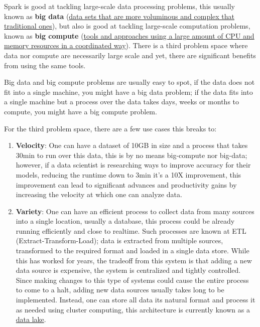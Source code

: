 \documentclass[]{book}
\theoremstyle{definition}
\theoremstyle{definition}
\theoremstyle{definition}
\theoremstyle{remark}
\begin{document}
Spark is good at tackling large-scale data processing problems, this
usually known as \textbf{big data}
(\href{https://en.wikipedia.org/wiki/big_data}{data sets that are more
voluminous and complex that traditional ones}), but also is good at
tackling large-scale computation problems, known as \textbf{big compute}
(\href{https://www.nimbix.net/glossary/big-compute/}{tools and
approaches using a large amount of CPU and memory resources in a
coordinated way}). There is a third problem space where data nor compute
are necessarily large scale and yet, there are significant benefits from
using the same tools.

Big data and big compute problems are usually easy to spot, if the data
does not fit into a single machine, you might have a big data problem;
if the data fits into a single machine but a process over the data takes
days, weeks or months to compute, you might have a big compute problem.

For the third problem space, there are a few use cases this breaks to:

\begin{enumerate}
\def\labelenumi{\arabic{enumi}.}
\item
  \textbf{Velocity}: One can have a dataset of 10GB in size and a
  process that takes 30min to run over this data, this is by no means
  big-compute nor big-data; however, if a data scientist is researching
  ways to improve accuracy for their models, reducing the runtime down
  to 3min it's a 10X improvement, this improvement can lead to
  significant advances and productivity gains by increasing the velocity
  at which one can analyze data.
\item
  \textbf{Variety}: One can have an efficient process to collect data
  from many sources into a single location, usually a database, this
  process could be already running efficiently and close to realtime.
  Such processes are known at ETL (Extract-Transform-Load); data is
  extracted from multiple sources, transformed to the required format
  and loaded in a single data store. While this has worked for years,
  the tradeoff from this system is that adding a new data source is
  expensive, the system is centralized and tightly controlled. Since
  making changes to this type of systems could cause the entire process
  to come to a halt, adding new data sources usually takes long to be
  implemented. Instead, one can store all data its natural format and
  process it as needed using cluster computing, this architecture is
  currently known as a
  \href{https://en.wikipedia.org/wiki/Data_lake}{data lake}.
\end{enumerate}
\end{document}
